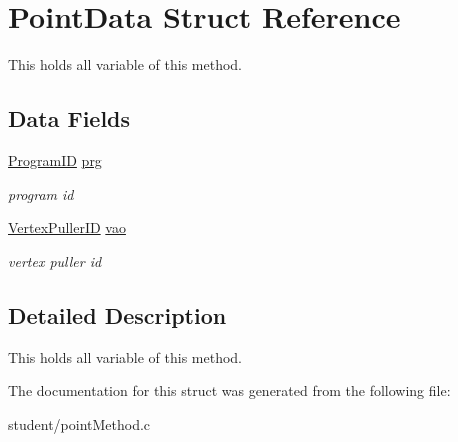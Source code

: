 \hypertarget{structPointData}{}\section{Point\+Data Struct Reference}
\label{structPointData}


This holds all variable of this method.  


\subsection*{Data Fields}
\begin{DoxyCompactItemize}
\item 
\mbox{\label{structPointData_ae5c008d1b00565769b1467128a348c21}} 
\hyperlink{student_2fwd_8h_a15e62786033208aec9487a51e808f81d}{Program\+ID} \hyperlink{structPointData_ae5c008d1b00565769b1467128a348c21}{prg}
\begin{DoxyCompactList}\small\item\em program id \end{DoxyCompactList}\item 
\mbox{\label{structPointData_a0ca955cba8c202ab8fe3dd09c9772a32}} 
\hyperlink{student_2fwd_8h_a23828e2281a794e193ebaf0df3e1f17c}{Vertex\+Puller\+ID} \hyperlink{structPointData_a0ca955cba8c202ab8fe3dd09c9772a32}{vao}
\begin{DoxyCompactList}\small\item\em vertex puller id \end{DoxyCompactList}\end{DoxyCompactItemize}


\subsection{Detailed Description}
This holds all variable of this method. 

The documentation for this struct was generated from the following file\+:\begin{DoxyCompactItemize}
\item 
student/point\+Method.\+c\end{DoxyCompactItemize}
